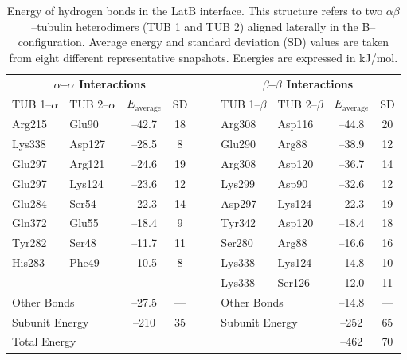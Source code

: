 \documentclass[11pt]{report}
\begin{document}
\begin{table}
  \caption[Energy of hydrogen bonds in the LatB interface]{Energy of hydrogen bonds in the LatB interface. 
  This structure refers to two $\alpha\beta$--tubulin 
  heterodimers (TUB 1 and TUB 2) aligned laterally in the 
  B--configuration. 
  Average energy and standard deviation (SD) values are taken from eight
  different representative snapshots.
  Energies are expressed in kJ/mol.}
  \label{t:THB-LatB}
  \centering
  \begin{tabular*}{\linewidth}{@{\extracolsep{\fill}}llccccllcc}
    \toprule
    \multicolumn{4}{c}{\textbf{$\alpha$--$\alpha$ Interactions}}&&&\multicolumn{4}{c}{\textbf{$\beta$--$\beta$ Interactions}}\\
    \cmidrule(r){1-4} \cmidrule(l){7-10}
    TUB 1--$\alpha$&TUB 2--$\alpha$&$E_{\text{average}}$&SD&&&TUB 1--$\beta$&TUB 2--$\beta$&$E_{\text{average}}$&SD\\
    \midrule
    Arg215&  Glu90&--42.7&18&&&Arg308&  Asp116&--44.8&20\\
    Lys338&  Asp127&--28.5&8&&&Glu290&  Arg88&--38.9&12\\
    Glu297&  Arg121&--24.6&19&&&Arg308&  Asp120&--36.7&14\\
    Glu297&  Lys124&--23.6&12&&&Lys299&  Asp90&--32.6&12\\
    Glu284&  Ser54&--22.3&14&&&Asp297&  Lys124&--22.3&19\\
    Gln372&  Glu55&--18.4&9&&&Tyr342&  Asp120&--18.4&18\\
    Tyr282&  Ser48&--11.7&11&&&Ser280&  Arg88&--16.6&16\\
    His283&  Phe49&--10.5&8&&&Lys338&  Lys124&--14.8&10\\
    &&&&&&Lys338&  Ser126&--12.0&11\\
    \multicolumn{2}{l}{{Other Bonds}}&--27.5&---&&&\multicolumn{2}{l}{{Other Bonds}}&--14.8&---\\
    \multicolumn{2}{l}{Subunit Energy}&--210&35&&&\multicolumn{2}{l}{Subunit Energy}&--252&65\\
    \multicolumn{8}{l}{Total Energy}&--462&70\\
    \bottomrule
  \end{tabular*} 
\end{table}
\end{document}
